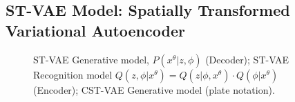 


\subsection{{\bf ST-VAE} Model: Spatially Transformed Variational Autoencoder}\label{sec:stvae}


\begin{figure}[t]
\begin{center}
\qquad
{}\qquad
{}
\end{center}
 \caption{ ST-VAE Generative model, $P(x^\theta | z,\phi)$ (Decoder);  ST-VAE Recognition model $Q(z,\phi |x^\theta) = Q(z | \phi,x^\theta)\cdot Q(\phi|x^\theta)$ (Encoder);  CST-VAE Generative model (plate notation).  }
 
\label{fig:stvaemodel}
\end{figure}


